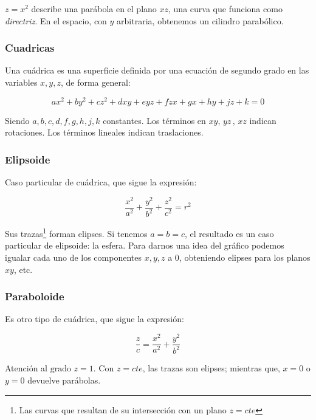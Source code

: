 \(z = x^{2}\) describe una parábola en el plano \(xz\),
una curva que funciona como \textit{directriz}.
En el espacio, con \(y\) arbitraria, obtenemos un cilindro parabólico.

\subsubsection{Cuadricas}

Una cuádrica es una superficie definida por una ecuación de segundo grado en las 
variables \(x, y, z\), de forma general:

\begin{equation*}
    ax^{2} + by^{2} + cz^{2} + dxy + eyz + fzx + gx + hy + jz + k = 0
\end{equation*}

Siendo \(a, b, c, d, f, g, h, j, k\) constantes.
Los términos en \(xy,\,yz\,,\,xz\) indican rotaciones.
Los términos lineales indican traslaciones.

\subsubsection{Elipsoide}

Caso particular de cuádrica, que sigue la expresión:

\begin{equation*}
    \frac{x^{2}}{a^{2}} + \frac{y^{2}}{b^{2}} + \frac{z^{2}}{c^{2}} = r^{2}
\end{equation*}

Sus trazas\footnote{Las curvas que resultan de su intersección con un plano \(z = cte\)}
forman elipses.
Si tenemos \(a = b = c\), el resultado es un caso particular de elipsoide: 
la esfera.
Para darnos una idea del gráfico podemos igualar cada uno de los componentes 
\(x, y, z\) a 0, obteniendo elipses para los planos \(xy\), etc.


\subsubsection{Paraboloide}

Es otro tipo de cuádrica, que sigue la expresión:

\begin{equation*}
    \frac{z}{c} = \frac{x^{2}}{a^{2}} + \frac{y^{2}}{b^{2}}
\end{equation*}

Atención al \(\text{grado }z = 1\).
Con \(z = cte\), las trazas son elipses;
mientras que, \(x = 0\) o \(y = 0\) devuelve parábolas.

